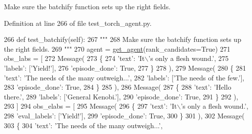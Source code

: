 \begin{DoxyVerb}Make sure the batchify function sets up the right fields.
\end{DoxyVerb}
 

Definition at line 266 of file test\+\_\+torch\+\_\+agent.\+py.


\begin{DoxyCode}
266     \textcolor{keyword}{def }test\_batchify(self):
267         \textcolor{stringliteral}{"""}
268 \textcolor{stringliteral}{        Make sure the batchify function sets up the right fields.}
269 \textcolor{stringliteral}{        """}
270         agent = \hyperlink{namespacetests_1_1test__torch__agent_ae929d109305aaea29fbfa13ecf1f32e9}{get\_agent}(rank\_candidates=\textcolor{keyword}{True})
271         obs\_labs = [
272             Message(
273                 \{
274                     \textcolor{stringliteral}{'text'}: \textcolor{stringliteral}{'It\(\backslash\)'s only a flesh wound.'},
275                     \textcolor{stringliteral}{'labels'}: [\textcolor{stringliteral}{'Yield!'}],
276                     \textcolor{stringliteral}{'episode\_done'}: \textcolor{keyword}{True},
277                 \}
278             ),
279             Message(
280                 \{
281                     \textcolor{stringliteral}{'text'}: \textcolor{stringliteral}{'The needs of the many outweigh...'},
282                     \textcolor{stringliteral}{'labels'}: [\textcolor{stringliteral}{'The needs of the few.'}],
283                     \textcolor{stringliteral}{'episode\_done'}: \textcolor{keyword}{True},
284                 \}
285             ),
286             Message(
287                 \{
288                     \textcolor{stringliteral}{'text'}: \textcolor{stringliteral}{'Hello there.'},
289                     \textcolor{stringliteral}{'labels'}: [\textcolor{stringliteral}{'General Kenobi.'}],
290                     \textcolor{stringliteral}{'episode\_done'}: \textcolor{keyword}{True},
291                 \}
292             ),
293         ]
294         obs\_elabs = [
295             Message(
296                 \{
297                     \textcolor{stringliteral}{'text'}: \textcolor{stringliteral}{'It\(\backslash\)'s only a flesh wound.'},
298                     \textcolor{stringliteral}{'eval\_labels'}: [\textcolor{stringliteral}{'Yield!'}],
299                     \textcolor{stringliteral}{'episode\_done'}: \textcolor{keyword}{True},
300                 \}
301             ),
302             Message(
303                 \{
304                     \textcolor{stringliteral}{'text'}: \textcolor{stringliteral}{'The needs of the many outweigh...'},

\end{DoxyCode}
